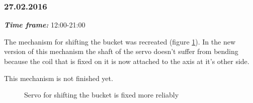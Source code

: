 \subsubsection{27.02.2016}
\textit{\textbf{Time frame:}} 12:00-21:00 

The mechanism for shifting the bucket was recreated (figure \ref{Shiftbuc2.8}). In the new version of this mechanism the shaft of the servo doesn't suffer from bending because the coil that is fixed on it is now attached to the axis at it's other side. 

This mechanism is not finished yet.

\begin{figure}[H]
	\begin{minipage}[h]{1\linewidth}
		\caption{Servo for shifting the bucket is fixed more reliably}
		\label{Shiftbuc2.8}
	\end{minipage}
\end{figure}
